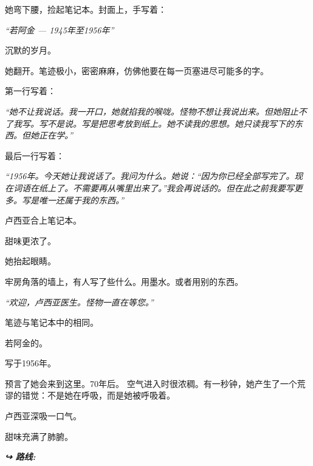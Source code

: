 \noindent 她弯下腰，捡起笔记本。封面上，手写着：

\noindent \textit{\textquotedblleft{}若阿金 --- 1945年至1956年\textquotedblright{}}

\noindent 沉默的岁月。

\noindent 她翻开。笔迹极小，密密麻麻，仿佛他要在每一页塞进尽可能多的字。

\noindent 第一行写着：

\noindent \textit{\textquotedblleft{}她不让我说话。我一开口，她就掐我的喉咙。怪物不想让我说出来。但她阻止不了我写。写不是说。写是把思考放到纸上。她不读我的思想。她只读我写下的东西。但她正在学。\textquotedblright{}}

\noindent 最后一行写着：

\noindent \textit{\textquotedblleft{}1956年。今天她让我说话了。我问为什么。她说：\textquotedblleft{}因为你已经全部写完了。现在词语在纸上了。不需要再从嘴里出来了。\textquotedblright{}我会再说话的。但在此之前我要写更多。写是唯一还属于我的东西。\textquotedblright{}}

\noindent 卢西亚合上笔记本。

\noindent 甜味更浓了。

\noindent 她抬起眼睛。

\noindent 牢房角落的墙上，有人写了些什么。用墨水。或者用别的东西。

\noindent \textit{\textquotedblleft{}欢迎，卢西亚医生。怪物一直在等您。\textquotedblright{}}

\noindent 笔迹与笔记本中的相同。

\noindent 若阿金的。

\noindent 写于1956年。

\noindent 预言了她会来到这里。70年后。
\noindent 空气进入时很浓稠。有一秒钟，她产生了一个荒谬的错觉：不是她在呼吸，而是她被呼吸着。

\noindent 卢西亚深吸一口气。

\noindent 甜味充满了肺腑。

\vspace{0.5em}
\noindent\textit{\textbf{↪ 路线:}  \rotasep {}}

